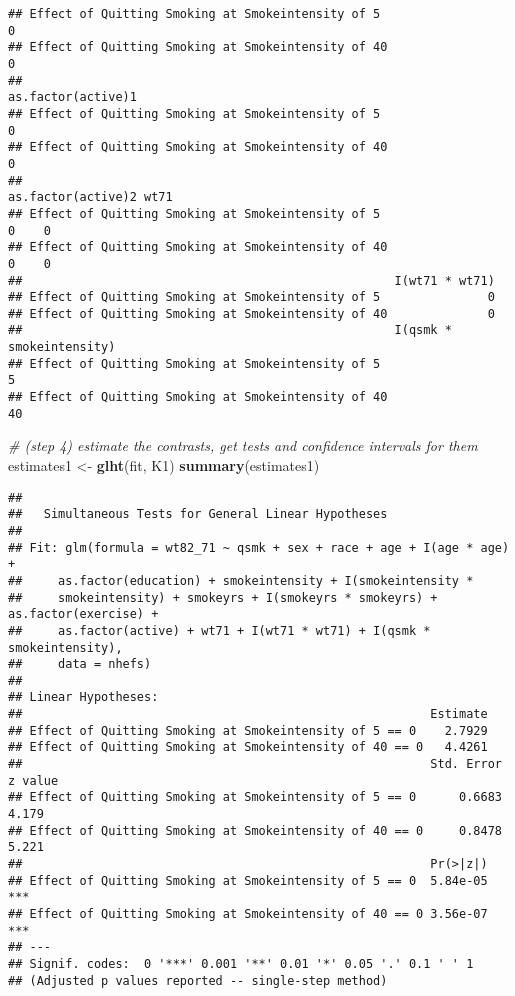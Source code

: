 \documentclass[10pt,]{book}
\newenvironment{Shaded}{\begin{snugshade}}{\end{snugshade}}
\newcommand{\CommentTok}[1]{\textcolor[rgb]{0.56,0.35,0.01}{\textit{#1}}}
\newcommand{\KeywordTok}[1]{\textcolor[rgb]{0.13,0.29,0.53}{\textbf{#1}}}
\newcommand{\NormalTok}[1]{#1}
\newcommand{\StringTok}[1]{\textcolor[rgb]{0.31,0.60,0.02}{#1}}
\begin{document}
\begin{verbatim}
## Effect of Quitting Smoking at Smokeintensity of 5                     0
## Effect of Quitting Smoking at Smokeintensity of 40                    0
##                                                    as.factor(active)1
## Effect of Quitting Smoking at Smokeintensity of 5                   0
## Effect of Quitting Smoking at Smokeintensity of 40                  0
##                                                    as.factor(active)2 wt71
## Effect of Quitting Smoking at Smokeintensity of 5                   0    0
## Effect of Quitting Smoking at Smokeintensity of 40                  0    0
##                                                    I(wt71 * wt71)
## Effect of Quitting Smoking at Smokeintensity of 5               0
## Effect of Quitting Smoking at Smokeintensity of 40              0
##                                                    I(qsmk * smokeintensity)
## Effect of Quitting Smoking at Smokeintensity of 5                         5
## Effect of Quitting Smoking at Smokeintensity of 40                       40
\end{verbatim}

\begin{Shaded}
\begin{Highlighting}[]
\CommentTok{# (step 4) estimate the contrasts, get tests and confidence intervals for them}
\NormalTok{estimates1 <-}\StringTok{ }\KeywordTok{glht}\NormalTok{(fit, K1)}
  \KeywordTok{summary}\NormalTok{(estimates1)}
\end{Highlighting}
\end{Shaded}

\begin{verbatim}
## 
##   Simultaneous Tests for General Linear Hypotheses
## 
## Fit: glm(formula = wt82_71 ~ qsmk + sex + race + age + I(age * age) + 
##     as.factor(education) + smokeintensity + I(smokeintensity * 
##     smokeintensity) + smokeyrs + I(smokeyrs * smokeyrs) + as.factor(exercise) + 
##     as.factor(active) + wt71 + I(wt71 * wt71) + I(qsmk * smokeintensity), 
##     data = nhefs)
## 
## Linear Hypotheses:
##                                                         Estimate
## Effect of Quitting Smoking at Smokeintensity of 5 == 0    2.7929
## Effect of Quitting Smoking at Smokeintensity of 40 == 0   4.4261
##                                                         Std. Error z value
## Effect of Quitting Smoking at Smokeintensity of 5 == 0      0.6683   4.179
## Effect of Quitting Smoking at Smokeintensity of 40 == 0     0.8478   5.221
##                                                         Pr(>|z|)    
## Effect of Quitting Smoking at Smokeintensity of 5 == 0  5.84e-05 ***
## Effect of Quitting Smoking at Smokeintensity of 40 == 0 3.56e-07 ***
## ---
## Signif. codes:  0 '***' 0.001 '**' 0.01 '*' 0.05 '.' 0.1 ' ' 1
## (Adjusted p values reported -- single-step method)
\end{verbatim}
\end{document}

